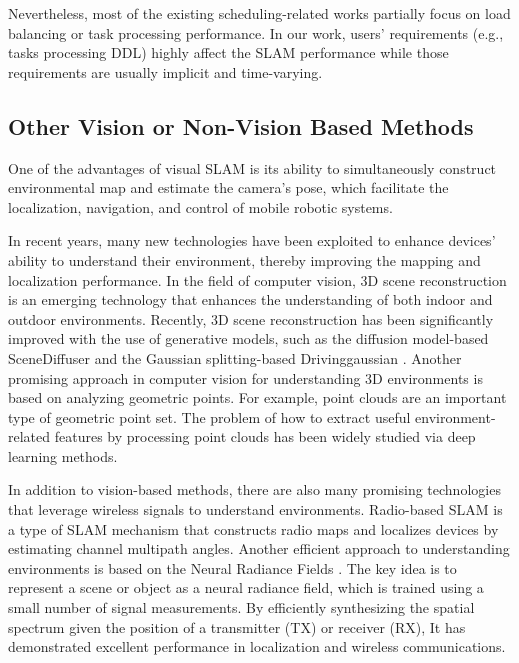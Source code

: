 Nevertheless, most of the existing scheduling-related works partially focus on load balancing or task processing performance. In our work, users' requirements (e.g., tasks processing DDL) highly affect the SLAM performance while those requirements are usually implicit and time-varying. 

{
\subsection{Other Vision or Non-Vision Based Methods} 
One of the advantages of visual SLAM is its ability to simultaneously construct environmental map and estimate the camera's pose, which facilitate the localization, navigation, and control of mobile robotic systems. 


In recent years, many new technologies have been exploited to enhance 
devices' ability to understand their environment, thereby improving the mapping and localization performance. In the field of computer vision, 3D scene reconstruction is an emerging technology that enhances the understanding of both indoor and outdoor environments. 
Recently, 3D scene reconstruction has been significantly improved with the use of generative models, such as the diffusion model-based SceneDiffuser \cite{huang2023diffusion} and the Gaussian splitting-based Drivinggaussian \cite{zhou2024drivinggaussian}. 
Another promising approach in computer vision for understanding 3D environments is based on analyzing geometric points. 
For example, point clouds are an important type of geometric point set. The problem of how to extract useful environment-related features by processing point clouds has been widely studied via deep learning methods\cite{qi2017pointnet++}. 

In addition to vision-based methods, there are also many promising technologies that leverage wireless signals to understand environments. Radio-based SLAM \cite{leitinger2019belief} is a type of SLAM mechanism that constructs radio maps and localizes devices by estimating channel multipath angles. 
Another efficient approach to understanding environments is based on the Neural Radiance Fields \cite{zhao2023nerf2}. The key idea is to represent a scene or object as a neural radiance field, which is trained using a small number of signal measurements. By efficiently synthesizing the spatial spectrum given the position of a transmitter (TX) or receiver (RX), It has demonstrated excellent performance in localization and wireless communications.

}
